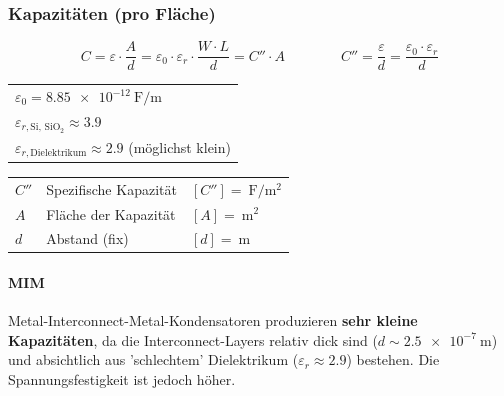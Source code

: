 \subsubsection{Kapazitäten (pro Fläche)}

\vspace{-0.3cm}

$$ \boxed{ C = \varepsilon \cdot  \frac{A}{d} = \varepsilon_0 \cdot \varepsilon_r \cdot \frac{W \cdot L}{d} =  C'' \cdot A } \qquad \qquad
    \boxed{ C'' = \frac{\varepsilon}{d} = \frac{\varepsilon_0 \cdot \varepsilon_r}{d} } $$

\begin{minipage}[t]{0.44\columnwidth}
    \begin{tabular}{l@{}}
        $\varepsilon_0 = \qty{8.85e-12}{\farad\per\meter}$                      \\
        $\varepsilon_{r, \text{Si, SiO$_2$}} \approx 3.9$                       \\
        $\varepsilon_{r, \text{Dielektrikum}} \approx 2.9$ (möglichst klein)   
    \end{tabular}   
\end{minipage}
\hfill
\begin{minipage}[t]{0.55\columnwidth}
    \begin{tabular}{lll@{}}
        $C''$   & Spezifische Kapazität & $[C''] = \qty{}{\farad\per\square\meter}$ \\
        $A$     & Fläche der Kapazität  & $[A] = \qty{}{\square\meter}$             \\
        $d$     & Abstand (fix)         & $[d] = \qty{}{\meter}$
    \end{tabular}
\end{minipage}



\paragraph{MIM}
Metal-Interconnect-Metal-Kondensatoren produzieren \textbf{sehr kleine Kapazitäten}, da die Interconnect-Layers relativ dick sind ($d \sim \qty{2.5e-7}{\meter}$) und absichtlich aus 'schlechtem' Dielektrikum ($\varepsilon_r \approx 2.9$) bestehen.
Die Spannungsfestigkeit ist jedoch höher.

